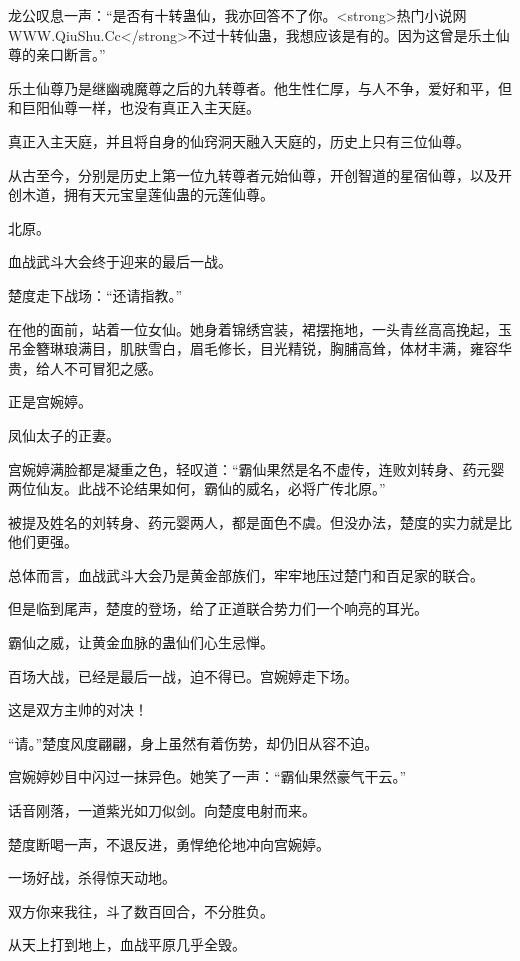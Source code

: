 
\begin{this_body}

龙公叹息一声：“是否有十转蛊仙，我亦回答不了你。<strong>热门小说网WWW.QiuShu.Cc</strong>不过十转仙蛊，我想应该是有的。因为这曾是乐土仙尊的亲口断言。”

乐土仙尊乃是继幽魂魔尊之后的九转尊者。他生性仁厚，与人不争，爱好和平，但和巨阳仙尊一样，也没有真正入主天庭。

真正入主天庭，并且将自身的仙窍洞天融入天庭的，历史上只有三位仙尊。

从古至今，分别是历史上第一位九转尊者元始仙尊，开创智道的星宿仙尊，以及开创木道，拥有天元宝皇莲仙蛊的元莲仙尊。

北原。

血战武斗大会终于迎来的最后一战。

楚度走下战场：“还请指教。”

在他的面前，站着一位女仙。她身着锦绣宫装，裙摆拖地，一头青丝高高挽起，玉吊金簪琳琅满目，肌肤雪白，眉毛修长，目光精锐，胸脯高耸，体材丰满，雍容华贵，给人不可冒犯之感。

正是宫婉婷。

凤仙太子的正妻。

宫婉婷满脸都是凝重之色，轻叹道：“霸仙果然是名不虚传，连败刘转身、药元婴两位仙友。此战不论结果如何，霸仙的威名，必将广传北原。”

被提及姓名的刘转身、药元婴两人，都是面色不虞。但没办法，楚度的实力就是比他们更强。

总体而言，血战武斗大会乃是黄金部族们，牢牢地压过楚门和百足家的联合。

但是临到尾声，楚度的登场，给了正道联合势力们一个响亮的耳光。

霸仙之威，让黄金血脉的蛊仙们心生忌惮。

百场大战，已经是最后一战，迫不得已。宫婉婷走下场。

这是双方主帅的对决！

“请。”楚度风度翩翩，身上虽然有着伤势，却仍旧从容不迫。

宫婉婷妙目中闪过一抹异色。她笑了一声：“霸仙果然豪气干云。”

话音刚落，一道紫光如刀似剑。向楚度电射而来。

楚度断喝一声，不退反进，勇悍绝伦地冲向宫婉婷。

一场好战，杀得惊天动地。

双方你来我往，斗了数百回合，不分胜负。

从天上打到地上，血战平原几乎全毁。


\end{this_body}
